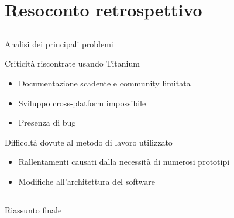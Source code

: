 \section{Resoconto retrospettivo}
	\subsection{}
		\begin{frame}{Analisi dei principali problemi}
			\begin{block}{Criticità riscontrate usando Titanium}
				\begin{itemize}
					\item Documentazione scadente e community limitata
					\item Sviluppo cross-platform impossibile
					\item Presenza di bug
				\end{itemize}
			\end{block}
			\begin{block}{Difficoltà dovute al metodo di lavoro utilizzato}
				\begin{itemize}
					\item Rallentamenti causati dalla necessità di numerosi prototipi
					\item Modifiche all'architettura del software
				\end{itemize}
			\end{block}
		\end{frame}
	\subsection{}
		\begin{frame}{Riassunto finale}
		\end{frame}
